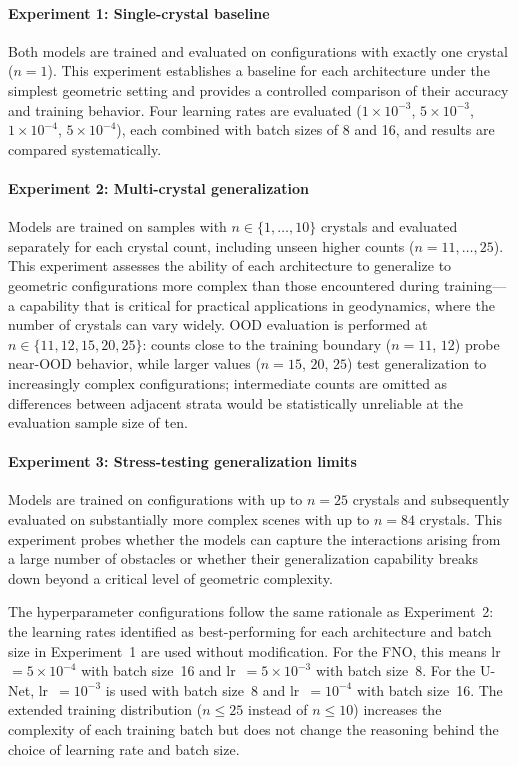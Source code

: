 \paragraph{Experiment 1: Single-crystal baseline}
Both models are trained and evaluated on configurations with exactly one crystal ($n = 1$). This experiment establishes a baseline for each architecture under the simplest geometric setting and provides a controlled comparison of their accuracy and training behavior.
Four learning rates are evaluated ($1 \times 10^{-3}$, $5 \times 10^{-3}$, $1 \times 10^{-4}$, $5 \times 10^{-4}$), each combined with batch sizes of 8 and 16, and results are compared systematically.

\paragraph{Experiment 2: Multi-crystal generalization}
Models are trained on samples with $n \in \{1, \ldots, 10\}$ crystals and evaluated separately for each crystal count, including unseen higher counts ($n = 11, \ldots, 25$). This experiment assesses the ability of each architecture to generalize to geometric configurations more complex than those encountered during training—a capability that is critical for practical applications in geodynamics, where the number of crystals can vary widely. OOD evaluation is performed at $n \in \{11, 12, 15, 20, 25\}$: counts close to the training boundary ($n = 11$, $12$) probe near-OOD behavior, while larger values ($n = 15$, $20$, $25$) test generalization to increasingly complex configurations; intermediate counts are omitted as differences between adjacent strata would be statistically unreliable at the evaluation sample size of ten.

\paragraph{Experiment 3: Stress-testing generalization limits}
Models are trained on configurations with up to $n = 25$ crystals and subsequently evaluated on substantially more complex scenes with up to $n = 84$ crystals. This experiment probes whether the models can capture the interactions arising from a large number of obstacles or whether their generalization capability breaks down beyond a critical level of geometric complexity.

The hyperparameter configurations follow the same rationale as Experiment~2: the learning rates identified as best-performing for each architecture and batch size in Experiment~1 are used without modification. For the FNO, this means lr~$= 5\times10^{-4}$ with batch size~16 and lr~$= 5\times10^{-3}$ with batch size~8. For the U-Net, lr~$= 10^{-3}$ is used with batch size~8 and lr~$= 10^{-4}$ with batch size~16. The extended training distribution ($n \leq 25$ instead of $n \leq 10$) increases the complexity of each training batch but does not change the reasoning behind the choice of learning rate and batch size.


